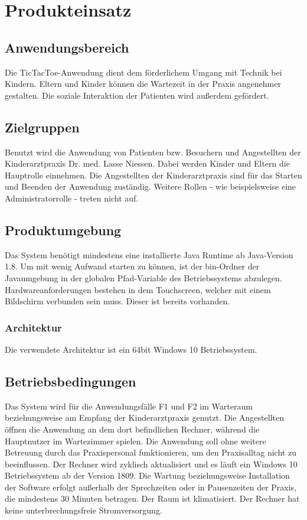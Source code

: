 \documentclass[12pt]{article}
\begin{document}
\section{Produkteinsatz}
\subsection{Anwendungsbereich}
Die \Gls{TicTacToe}-Anwendung dient dem förderlichem Umgang mit Technik bei Kindern. Eltern und Kinder können die Wartezeit in der Praxis angenehmer gestalten. Die soziale Interaktion der Patienten wird außerdem gefördert.
\subsection{Zielgruppen}
Benutzt wird die Anwendung von Patienten bzw. Besuchern und Angestellten der Kinderarztpraxis Dr. med. Lasse Niessen. Dabei werden Kinder und Eltern die Hauptrolle einnehmen. Die Angestellten der Kinderarztpraxis sind für das Starten und Beenden der Anwendung zuständig. Weitere Rollen - wie beispielsweise eine Administratorrolle - treten nicht auf.
\subsection{Produktumgebung}
Das System benötigt mindestens eine installierte Java Runtime ab Java-Version 1.8. Um mit wenig Aufwand starten zu können, ist der bin-Ordner der Javaumgebung in der globalen Pfad-Variable des Betriebssystems abzulegen.
Hardwareanforderungen bestehen in dem Touchscreen, welcher mit einem Bildschirm verbunden sein muss. Dieser ist bereits vorhanden.
\subsubsection{Architektur}
Die verwendete Architektur ist ein 64bit Windows 10 Betriebssystem.
\subsection{Betriebsbedingungen}
Das System wird für die Anwendungsfälle F1 und F2 im Warteraum beziehungsweise am Empfang der Kinderarztpraxis genutzt. Die Angestellten öffnen die Anwendung an dem dort befindlichen Rechner, während die Hauptnutzer im Wartezimmer spielen. Die Anwendung soll ohne weitere Betreuung durch das Praxispersonal funktionieren, um den Praxisalltag nicht zu beeinflussen. Der Rechner wird zyklisch aktualisiert und es läuft ein Windows 10 Betriebssystem ab der Version 1809. Die Wartung beziehungsweise Installation der Software erfolgt außerhalb der Sprechzeiten oder in Pausenzeiten der Praxis, die mindestens 30 Minuten betragen. Der Raum ist klimatisiert. Der Rechner hat keine unterbrechungsfreie Stromversorgung.
\end{document}
